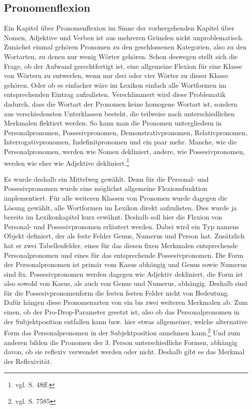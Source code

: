 \subsection{Pronomenflexion}
\label{subsec:pronomen}
Ein Kapitel über Pronomenflexion im Sinne der vorhergehenden Kapitel über Nomen, Adjektive und Verben ist aus mehreren Gründen nicht unproblematisch. Zunächst einmal gehören Pronomen zu den geschlossenen Kategorien, also zu den Wortarten, zu denen nur wenig Wörter gehören. Schon deswegen stellt sich die Frage, ob der Aufwand gerechtfertigt ist, eine allgemeine Flexion für eine Klasse von Wörtern zu entwerfen, wenn nur drei oder vier Wörter zu dieser Klasse gehören. Oder ob es einfacher wäre im Lexikon einfach alle Wortformen im entsprechenden Eintrag aufzulisten. Verschlimmert wird diese Problematik dadurch, dass die Wortart der Pronomen keine homogene Wortart ist, sondern aus verschiedensten Unterklassen besteht, die teilweise nach unterschiedlichen Merkmalen flektiert werden. So kann man die Pronomen untergliedern in Personalpronomen, Possesivpronomen, Demonstrativpronomen, Relativpronomen, Interrogativpronomen, Indefinitpronomen und ein paar mehr. Manche, wie die Personalpronomen, werden wie Nomen dekliniert, andere, wie Possesivpronomen, werden wie eher wie Adjektive dekliniert.\footnote{vgl. \cite{BAYER-LINDAUER1994} S. 48ff.} \par
Es wurde deshalb ein Mittelweg gewählt. Denn für die Personal- und Possesivpronomen wurde eine möglichst allgemeine Flexionsfunktion implementiert. Für alle weiteren Klassen von Pronomen wurde dagegen die Lösung gewählt, alle Wortformen im Lexikon direkt aufzulisten. Dies wurde ja bereits im Lexikonkapitel kurz erwähnt. Deshalb soll hier die Flexion von Personal- und Possesivpronomen erläutert werden. Dabei wird ein Typ namens Objekt definiert, der als feste Felder Genus, Numerus und Person hat. Zusätzlich hat er zwei Tabellenfelder, eines für das diesen fixen Merkmalen entsprechende Personalpronomen und eines für das entsprechende Possesivpronomen. Die Form der Personalpronomen ist primär vom Kasus abhängig und Genus sowie Numerus sind fix. Possesivpronomen werden dagegen wie Adjektiv dekliniert, die Form ist also sowohl von Kasus, als auch von Genus und Numerus, abhängig. Deshalb sind für die Possesivpronomenform die festen festen Felder nicht von Bedeutung. Dafür hängen diese Pronomenarten von ein bis zwei weiteren Merkmalen ab. Zum einen, ob der Pro-Drop-Parameter gesetzt ist, also ob das Personalpronomen in der Subjektposition entfallen kann bzw. hier etwas allgemeiner, welche alternative Form das Personalpronomen in der Subjektposition annehmen kann.\footnote{vgl. \cite{METZLER2004} S. 7585} Und zum anderen bilden die Pronomen der 3. Person unterschiedliche Formen, abhängig davon, ob sie reflexiv verwendet werden oder nicht. Deshalb gibt es das Merkmal der Reflexivität. \par
